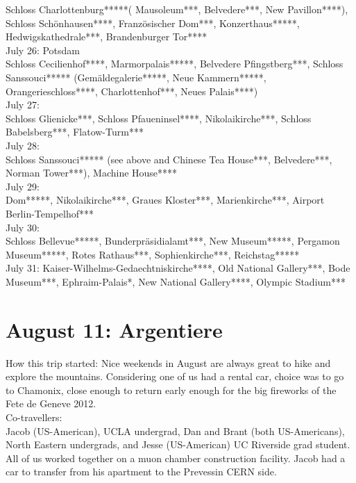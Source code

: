 Schloss Charlottenburg*****( Mausoleum***, Belvedere***, New Pavillon****), Schloss Sch\"onhausen****, Franz\"osischer Dom***, Konzerthaus*****, Hedwigskathedrale***, Brandenburger Tor****\\

July 26: Potsdam\\
Schloss Cecilienhof****, Marmorpalais*****, Belvedere Pfingstberg***, Schloss Sanssouci***** (Gem\"aldegalerie*****, Neue Kammern*****, Orangerieschloss****, Charlottenhof***, Neues Palais****)\\

July 27:\\
Schloss Glienicke***, Schloss Pfaueninsel****, Nikolaikirche***, Schloss Babelsberg***, Flatow-Turm***\\

July 28:\\
Schloss Sanssouci***** (see above and Chinese Tea House***, Belvedere***, Norman Tower***), Machine House****\\

July 29:\\
Dom*****, Nikolaikirche***, Graues Kloster***, Marienkirche***, Airport Berlin-Tempelhof***\\

July 30:\\
Schloss Bellevue*****, Bunderpr\"asidialamt***, New Museum*****, Pergamon Museum*****, Rotes Rathaus***, Sophienkirche***, Reichstag*****\\

July 31:
Kaiser-Wilhelms-Gedaechtniskirche****, Old National Gallery***, Bode Museum***, Ephraim-Palais*, New National Gallery****, Olympic Stadium***

\section{August 11: Argentiere}
\label{Argentiere2012}

How this trip started: Nice weekends in August are always great to hike and explore the mountains. Considering one of us had a rental car, choice was to go to Chamonix, close enough to return early enough for the big fireworks of the Fete de Geneve 2012.\\

Co-travellers:\\
Jacob (US-American), UCLA undergrad, Dan and Brant (both US-Americans), North Eastern undergrads, and Jesse (US-American) UC Riverside grad student. All of us worked together on a muon chamber construction facility. Jacob had a car to transfer from his apartment to the Prevessin CERN side.\\

